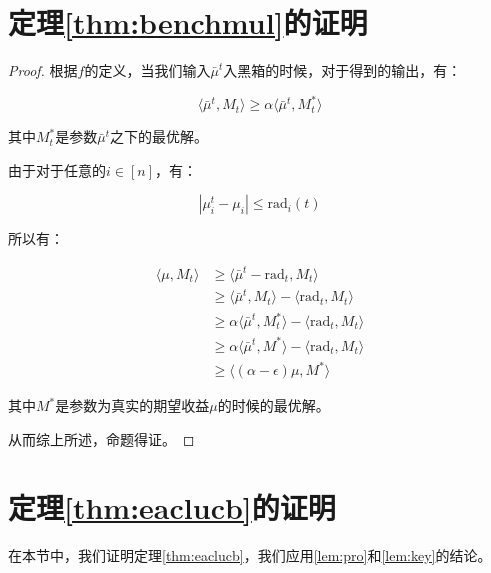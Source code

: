 \documentclass[bachelor]{thuthesis}
\begin{document}
\section{定理\ref{thm:benchmul}的证明}

\begin{proof}


根据$f$的定义，当我们输入$\bar{\mu}^{t}$入黑箱的时候，对于得到的输出，有：

\[\langle \bar{\mu}^t, M_t\rangle\ge \alpha \langle \bar{\mu}^t, M^*_t\rangle\]

其中$M^*_t$是参数$\bar{\mu}^t$之下的最优解。

由于对于任意的$i\in [n]$，有：

\[|\mu^t_i-\mu_i|\le\text{rad}_i(t)\]

所以有：

\begin{equation}
\begin{split}
\langle \mu, M_t\rangle  & \ge \langle \bar{\mu}^t-\text{rad}_t, M_t\rangle\\
                         & \ge \langle \bar{\mu}^t, M_t\rangle-\langle \text{rad}_t,M_t\rangle\\
                         & \ge \alpha\langle\bar{\mu}^t, M^*_t\rangle-\langle \text{rad}_t,M_t\rangle\\
                         & \ge \alpha\langle\bar{\mu}^t, M^*\rangle-\langle \text{rad}_t,M_t\rangle\\
                         & \ge \langle (\alpha-\epsilon)\mu, M^*\rangle
\end{split}
\end{equation}

其中$M^*$是参数为真实的期望收益$\mu$的时候的最优解。

从而综上所述，命题得证。



\end{proof}

\section{定理\ref{thm:eaclucb}的证明}


在本节中，我们证明定理\ref{thm:eaclucb}，我们应用\ref{lem:pro}和\ref{lem:key}的结论。
\end{document}
